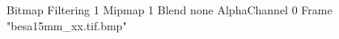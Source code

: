 {Bitmap
	{Filtering 1}
	{Mipmap 1}
	{Blend none}
	{AlphaChannel 0}
	{Frame "besa15mm_xx.tif.bmp"}
}
